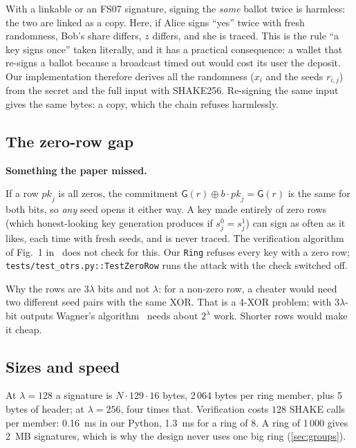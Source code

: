 \documentclass[11pt,a4paper]{article}
\newcommand{\pk}{\mathit{pk}}
\newcommand{\Gf}{\mathsf{G}}
\newcommand{\file}[1]{\texttt{#1}}
\newenvironment{flagbox}[1][Heads up]{%
  \def\FrameCommand{\fboxsep=8pt\fcolorbox{flagrule}{flagbg}}%
  \MakeFramed{\advance\hsize-2\fboxsep\FrameRestore}%
  \noindent\textbf{#1.}\par\smallskip%
}{\endMakeFramed}
\theoremstyle{definition}
\begin{document}
With a linkable or an FS07 signature, signing the \emph{same} ballot twice
is harmless: the two are linked as a copy. Here, if Alice signs ``yes''
twice with fresh randomness, Bob's share differs, $z$ differs, and she is
traced. This is the rule ``a key signs once'' taken literally, and it has a
practical consequence: a wallet that re-signs a ballot because a broadcast
timed out would cost its user the deposit. Our implementation therefore
derives all the randomness ($x_i$ and the seeds $r_{i,j}$) from the secret
and the full input with SHAKE256. Re-signing the same input gives the same
bytes: a copy, which the chain refuses harmlessly.

\subsection{The zero-row gap}
\label{sec:zerorow}

\begin{flagbox}[Something the paper missed]
If a row $\pk_j$ is all zeros, the commitment $\Gf(r) \oplus b\cdot\pk_j =
\Gf(r)$ is the same for both bits, so \emph{any} seed opens it either way.
A key made entirely of zero rows (which honest-looking key generation
produces if $s^0_j = s^1_j$) can sign as often as it likes, each time with
fresh seeds, and is never traced. The verification algorithm of Fig.~1
in~\cite{SZ21} does not check for this. Our \file{Ring} refuses every key
with a zero row; \file{tests/test\_otrs.py::TestZeroRow} runs the attack
with the check switched off.
\end{flagbox}

\noindent
Why the rows are $3\lambda$ bits and not $\lambda$: for a non-zero row, a
cheater would need two different seed pairs with the same XOR. That is a
4-XOR problem; with $3\lambda$-bit outputs Wagner's
algorithm~\cite{Wagner02} needs about $2^\lambda$ work. Shorter rows would
make it cheap.

\subsection{Sizes and speed}

At $\lambda = 128$ a signature is $N \cdot 129 \cdot 16$ bytes, 2\,064
bytes per ring member, plus 5 bytes of header; at $\lambda = 256$, four
times that. Verification costs $128$ SHAKE calls per member: 0.16~ms in our
Python, 1.3~ms for a ring of 8. A ring of 1\,000 gives 2~MB signatures,
which is why the design never uses one big ring (\cref{sec:groups}).
\end{document}
